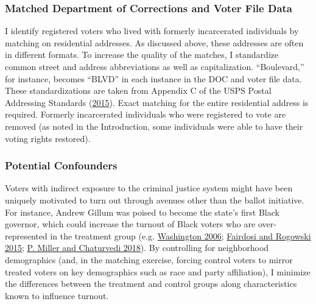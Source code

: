 \documentclass[
  12pt,
]{article}
\begin{document}
\hypertarget{matched-department-of-corrections-and-voter-file-data}{%
\subsubsection*{Matched Department of Corrections and Voter File Data}\label{matched-department-of-corrections-and-voter-file-data}}

I identify registered voters who lived with formerly incarcerated individuals by matching on residential addresses. As discussed above, these addresses are often in different formats. To increase the quality of the matches, I standardize common street and address abbreviations as well as capitalization. ``Boulevard,'' for instance, becomes ``BLVD'' in each instance in the DOC and voter file data. These standardizations are taken from Appendix C of the USPS Postal Addressing Standards (\protect\hyperlink{ref-USPS2015}{2015}). Exact matching for the entire residential address is required. Formerly incarcerated individuals who were registered to vote are removed (as noted in the Introduction, some individuals were able to have their voting rights restored).

\hypertarget{potential-confounders}{%
\subsubsection*{Potential Confounders}\label{potential-confounders}}

Voters with indirect exposure to the criminal justice system might have been uniquely motivated to turn out through avenues other than the ballot initiative. For instance, Andrew Gillum was poised to become the state's first Black governor, which could increase the turnout of Black voters who are over-represented in the treatment group (e.g. \protect\hyperlink{ref-Washington2006}{Washington 2006}; \protect\hyperlink{ref-Fairdosi2015}{Fairdosi and Rogowski 2015}; \protect\hyperlink{ref-Miller2018}{P. Miller and Chaturvedi 2018}). By controlling for neighborhood demographics (and, in the matching exercise, forcing control voters to mirror treated voters on key demographics such as race and party affiliation), I minimize the differences between the treatment and control groups along characteristics known to influence turnout.
\end{document}
